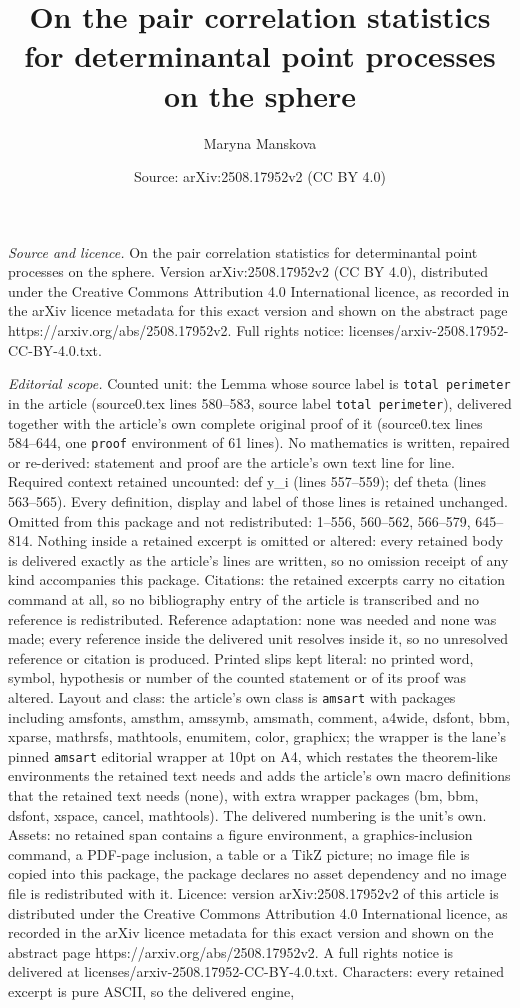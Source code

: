 \documentclass[10pt,a4paper]{amsart}
\title[On the pair correlation statistics for determinantal point p]{On the pair correlation statistics for determinantal point processes on the sphere}
\author{Maryna Manskova}
\date{Source: arXiv:2508.17952v2 (CC BY 4.0)}
\begin{document}
\maketitle

\noindent\emph{Source and licence.} On the pair correlation statistics for determinantal point processes on the sphere. Version arXiv:2508.17952v2 (CC BY 4.0), distributed under the Creative Commons Attribution 4.0 International licence, as recorded in the arXiv licence metadata for this exact version and shown on the abstract page https://arxiv.org/abs/2508.17952v2. Full rights notice: licenses/arxiv-2508.17952-CC-BY-4.0.txt.\par\smallskip

\noindent\textit{Editorial scope.} Counted unit: the Lemma whose source label is \texttt{total perimeter} in the article (source0.tex lines 580--583, source label \texttt{total perimeter}), delivered together with the article's own complete original proof of it (source0.tex lines 584--644, one \texttt{proof} environment of 61 lines). No mathematics is written, repaired or re-derived: statement and proof are the article's own text line for line. Required context retained uncounted: def y\_i (lines 557--559); def theta (lines 563--565). Every definition, display and label of those lines is retained unchanged. Omitted from this package and not redistributed: 1--556, 560--562, 566--579, 645--814. Nothing inside a retained excerpt is omitted or altered: every retained body is delivered exactly as the article's lines are written, so no omission receipt of any kind accompanies this package. Citations: the retained excerpts carry no citation command at all, so no bibliography entry of the article is transcribed and no reference is redistributed. Reference adaptation: none was needed and none was made; every reference inside the delivered unit resolves inside it, so no unresolved reference or citation is produced. Printed slips kept literal: no printed word, symbol, hypothesis or number of the counted statement or of its proof was altered. Layout and class: the article's own class is \texttt{amsart} with packages including amsfonts, amsthm, amssymb, amsmath, comment, a4wide, dsfont, bbm, xparse, mathrsfs, mathtools, enumitem, color, graphicx; the wrapper is the lane's pinned \texttt{amsart} editorial wrapper at 10pt on A4, which restates the theorem-like environments the retained text needs and adds the article's own macro definitions that the retained text needs (none), with extra wrapper packages (bm, bbm, dsfont, xspace, cancel, mathtools). The delivered numbering is the unit's own. Assets: no retained span contains a figure environment, a graphics-inclusion command, a PDF-page inclusion, a table or a TikZ picture; no image file is copied into this package, the package declares no asset dependency and no image file is redistributed with it. Licence: version arXiv:2508.17952v2 of this article is distributed under the Creative Commons Attribution 4.0 International licence, as recorded in the arXiv licence metadata for this exact version and shown on the abstract page https://arxiv.org/abs/2508.17952v2. A full rights notice is delivered at licenses/arxiv-2508.17952-CC-BY-4.0.txt. Characters: every retained excerpt is pure ASCII, so the delivered engine, 
\end{document}
